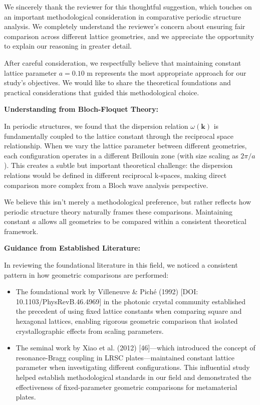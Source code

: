 \documentclass[11pt,a4paper]{article}
\newenvironment{responsebox}{%
    \par\medskip\noindent{\color{responsecolor}\rule{\linewidth}{2pt}}\par
    \noindent{\color{responsecolor}\bfseries Response}\par\smallskip
}{%
    \par\noindent{\color{responsecolor}\rule{\linewidth}{0.5pt}}\medskip
}
\begin{document}
\begin{responsebox}
We sincerely thank the reviewer for this thoughtful suggestion, which touches on an important methodological consideration in comparative periodic structure analysis. We completely understand the reviewer's concern about ensuring fair comparison across different lattice geometries, and we appreciate the opportunity to explain our reasoning in greater detail.

After careful consideration, we respectfully believe that maintaining constant lattice parameter $a = 0.10$ m represents the most appropriate approach for our study's objectives. We would like to share the theoretical foundations and practical considerations that guided this methodological choice.

\textbf{Understanding from Bloch-Floquet Theory:}

In periodic structures, we found that the dispersion relation $\omega(\mathbf{k})$ is fundamentally coupled to the lattice constant through the reciprocal space relationship. When we vary the lattice parameter between different geometries, each configuration operates in a different Brillouin zone (with size scaling as $2\pi/a$). This creates a subtle but important theoretical challenge: the dispersion relations would be defined in different reciprocal k-spaces, making direct comparison more complex from a Bloch wave analysis perspective.

We believe this isn't merely a methodological preference, but rather reflects how periodic structure theory naturally frames these comparisons. Maintaining constant $a$ allows all geometries to be compared within a consistent theoretical framework.

\textbf{Guidance from Established Literature:}

In reviewing the foundational literature in this field, we noticed a consistent pattern in how geometric comparisons are performed:

\begin{itemize}
    \item The foundational work by Villeneuve \& Pich\'{e} (1992) [DOI: 10.1103/PhysRevB.46.4969] in the photonic crystal community established the precedent of using fixed lattice constants when comparing square and hexagonal lattices, enabling rigorous geometric comparison that isolated crystallographic effects from scaling parameters.

    \item The seminal work by Xiao et al. (2012) [46]---which introduced the concept of resonance-Bragg coupling in LRSC plates---maintained constant lattice parameter when investigating different configurations. This influential study helped establish methodological standards in our field and demonstrated the effectiveness of fixed-parameter geometric comparisons for metamaterial plates.


\end{itemize}
\end{responsebox}
\end{document}
